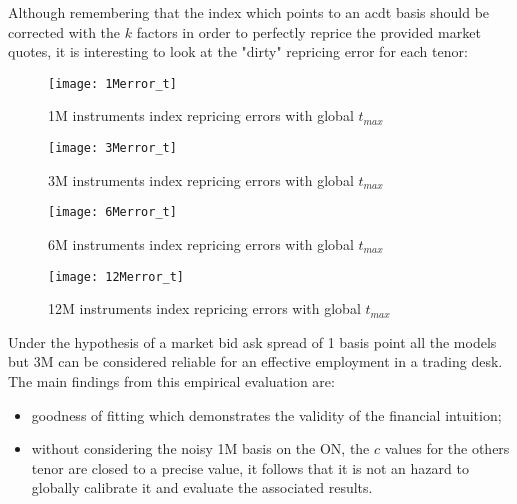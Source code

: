 Although remembering that the index which points to an acdt basis should be corrected with the $k$ factors in order to perfectly reprice the provided market quotes, it is interesting to look at the "dirty" repricing error for each tenor:

\begin{figure}[H]
\centering
\texttt{[image: 1Merror\_t]}
\caption{1M instruments index repricing errors with global $t_{max}$}
\label{fig:1Merror_t}
\end{figure}

\begin{figure}[H]
\centering
\texttt{[image: 3Merror\_t]}
\caption{3M instruments index repricing errors with global $t_{max}$}
\label{fig:3Merror_t}
\end{figure}

\begin{figure}[H]
\centering
\texttt{[image: 6Merror\_t]}
\caption{6M instruments index repricing errors with global $t_{max}$}
\label{fig:6Merror_t}
\end{figure}

\begin{figure}[H]
\centering
\texttt{[image: 12Merror\_t]}
\caption{12M instruments index repricing errors with global $t_{max}$}
\label{fig:12Merror_t}
\end{figure}

Under the hypothesis of a market bid ask spread of 1 basis point all the models but 3M can be considered reliable for an effective employment in a trading desk.
The main findings from this empirical evaluation are:

\begin{itemize}
    \item goodness of fitting which demonstrates the validity of the financial intuition;
    \item without considering the noisy 1M basis on the ON, the $c$ values for the others tenor are closed to a precise value, it follows that it is not an hazard to globally calibrate it and evaluate the associated results.
\end{itemize}

